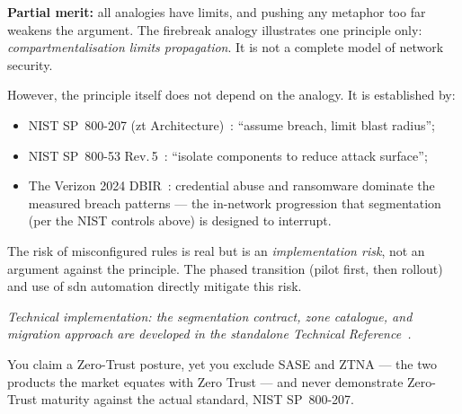 \begin{answerbox}[Answer to Q1.4]
\textbf{Partial merit:} all analogies have limits, and pushing any metaphor too far weakens the argument. The firebreak analogy illustrates one principle only: \emph{compartmentalisation limits propagation}. It is not a complete model of network security.

\medskip\noindent However, the principle itself does not depend on the analogy. It is established by:
\begin{itemize}[nosep]
    \item NIST SP~800-207 (\gls{zt} Architecture)~\cite{nist-zt}: ``assume breach, limit blast radius'';
    \item NIST SP~800-53 Rev.\,5~\cite{nist-sp800-53}: ``isolate components to reduce attack surface'';
    \item The Verizon 2024 DBIR~\cite{verizon-dbir2024}: credential abuse and ransomware dominate the measured breach patterns --- the in-network progression that segmentation (per the NIST controls above) is designed to interrupt.
\end{itemize}

\noindent The risk of misconfigured rules is real but is an \emph{implementation risk}, not an argument against the principle. The phased transition (pilot first, then rollout) and use of \gls{sdn} automation directly mitigate this risk.

\smallskip\noindent\textit{\footnotesize Technical implementation: the segmentation contract, zone catalogue, and migration approach are developed in the standalone Technical Reference~\cite{ng-tech-ref-2026}.}
\end{answerbox}

\bigskip

\begin{questionbox}
You claim a Zero-Trust posture, yet you exclude SASE and ZTNA --- the two products the market equates with Zero Trust --- and never demonstrate Zero-Trust maturity against the actual standard, NIST SP~800-207.
\end{questionbox}

